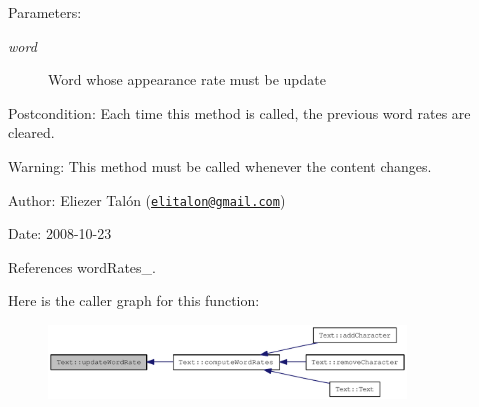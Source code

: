\begin{Desc}
\item[Parameters:]
\begin{description}
\item[{\em word}]Word whose appearance rate must be update\end{description}
\end{Desc}
\begin{Desc}
\item[Postcondition:]Each time this method is called, the previous word rates are cleared.\end{Desc}
\begin{Desc}
\item[Warning:]This method must be called whenever the content changes.\end{Desc}
\begin{Desc}
\item[Author:]Eliezer Talón (\href{mailto:elitalon@gmail.com}{\tt elitalon@gmail.com}) \end{Desc}
\begin{Desc}
\item[Date:]2008-10-23 \end{Desc}


References wordRates\_\-.

Here is the caller graph for this function:\nopagebreak
\begin{figure}[H]
\begin{center}
\leavevmode
\includegraphics[width=269pt]{class_text_5ab8f9bfa566de537a167991fe10eff5_icgraph}
\end{center}
\end{figure}
